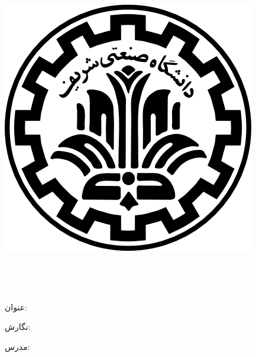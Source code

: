 
\pagestyle{empty}

\begin{center}
	
	\includegraphics[scale=0.2]{front/template/images/logo.png}
	
	\begin{large}
		
		\vspace{-0.2cm}
		\ThesisUniversity \\[-0.3em]
		\ThesisDepartment
		
		\vspace{0.5cm}
		
		\ThesisType \\[-0.3em]
		\ThesisMajor
		
	\end{large}
	
	\vspace{1cm}
	
	{عنوان:}\\[1.2em]
	{\LARGE\textbf{\ThesisTitle}}
	
	\vspace{1cm}
	
	{نگارش:}\\[.5em]
	{\large\textbf{\ThesisAuthor}}
	
	\vspace{0.7cm}
	
	{مدرس:}\\[.5em]
	{\large\textbf{\ThesisSupervisor}}
	
	\vspace{1.3cm}
	
	\ThesisDate
	
\end{center}

\newpage
